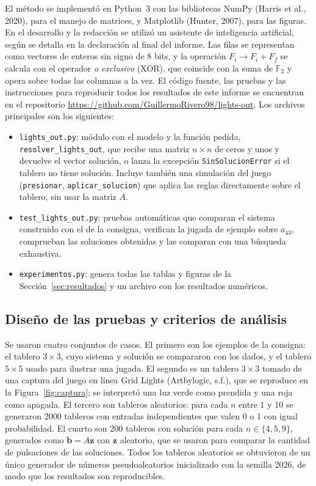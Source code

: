 \documentclass[12pt,a4paper]{article}
\newcommand{\repositorio}{https://github.com/GuillermoRivero98/lights-out}
\theoremstyle{plain}
\theoremstyle{definition}
\theoremstyle{remark}
\newcommand{\F}{\mathbb{F}_2}
\newcommand{\codigo}[1]{\texttt{#1}}
\begin{document}
El método se implementó en Python~3 con las bibliotecas NumPy (Harris et al., 2020), para el manejo de matrices, y Matplotlib (Hunter, 2007), para las figuras. En el desarrollo y la redacción se utilizó un asistente de inteligencia artificial, según se detalla en la declaración al final del informe. Las filas se representan como vectores de enteros sin signo de 8 bits, y la operación $F_i\to F_i+F_f$ se calcula con el operador \textit{o exclusivo} (XOR), que coincide con la suma de $\F$ y opera sobre todas las columnas a la vez. El código fuente, las pruebas y las instrucciones para reproducir todos los resultados de este informe se encuentran en el repositorio \url{\repositorio}. Los archivos principales son los siguientes:
\begin{itemize}[leftmargin=2em,itemsep=0pt]
  \item \codigo{lights\_out.py}: módulo con el modelo y la función pedida, \codigo{resolver\_lights\_out}, que recibe una matriz $n\times n$ de ceros y unos y devuelve el vector solución, o lanza la excepción \codigo{SinSolucionError} si el tablero no tiene solución. Incluye también una simulación del juego (\codigo{presionar}, \codigo{aplicar\_solucion}) que aplica las reglas directamente sobre el tablero, sin usar la matriz $A$.
  \item \codigo{test\_lights\_out.py}: pruebas automáticas que comparan el sistema construido con el de la consigna, verifican la jugada de ejemplo sobre $a_{43}$, comprueban las soluciones obtenidas y las comparan con una búsqueda exhaustiva.
  \item \codigo{experimentos.py}: genera todas las tablas y figuras de la Sección~\ref{sec:resultados} y un archivo con los resultados numéricos.
\end{itemize}

\subsection{Diseño de las pruebas y criterios de análisis}\label{sec:pruebas}

Se usaron cuatro conjuntos de casos. El primero son los ejemplos de la consigna: el tablero $3\times 3$, cuyo sistema y solución se compararon con los dados, y el tablero $5\times 5$ usado para ilustrar una jugada. El segundo es un tablero $3\times 3$ tomado de una captura del juego en línea Grid Lights (Artbylogic, s.f.), que se reproduce en la Figura~\ref{fig:captura}; se interpretó una luz verde como prendida y una roja como apagada. El tercero son tableros aleatorios: para cada $n$ entre 1 y 10 se generaron 2000 tableros con entradas independientes que valen 0 o 1 con igual probabilidad. El cuarto son 200 tableros con solución para cada $n\in\{4,5,9\}$, generados como $\mathbf{b}=A\mathbf{z}$ con $\mathbf{z}$ aleatorio, que se usaron para comparar la cantidad de pulsaciones de las soluciones. Todos los tableros aleatorios se obtuvieron de un único generador de números pseudoaleatorios inicializado con la semilla 2026, de modo que los resultados son reproducibles.
\end{document}
